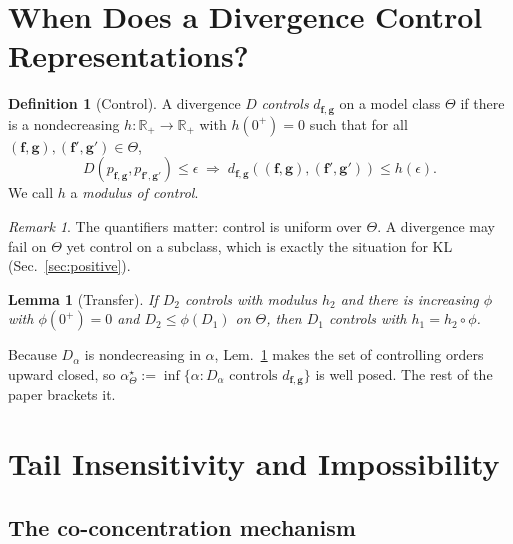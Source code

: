 \documentclass[10pt,letterpaper,twocolumn]{article}
\newcommand{\bff}{\mathbf{f}}
\newcommand{\bfg}{\mathbf{g}}
\newcommand{\dfg}{d_{\bff,\bfg}}
\newcommand{\Dalpha}{D_{\alpha}}
\theoremstyle{plain}
\newtheorem{lemma}[theorem]{Lemma}
\theoremstyle{definition}
\newtheorem{definition}[theorem]{Definition}
\theoremstyle{remark}
\newtheorem{remark}[theorem]{Remark}
\begin{document}
\section{When Does a Divergence Control Representations?}
\label{sec:control}

\begin{definition}[Control]
\label{def:control}
A divergence $D$ \emph{controls} $\dfg$ on a model class $\Theta$ if there is a
nondecreasing $h:\mathbb{R}_{+}\!\to\!\mathbb{R}_{+}$ with $h(0^{+})=0$ such
that for all $(\bff,\bfg),(\bff',\bfg')\in\Theta$,
\begin{equation}
D\!\left(p_{\bff,\bfg},p_{\bff',\bfg'}\right)\le\epsilon
\;\Longrightarrow\;
\dfg\!\left((\bff,\bfg),(\bff',\bfg')\right)\le h(\epsilon).
\label{eq:control}
\end{equation}
We call $h$ a \emph{modulus of control}.
\end{definition}

\begin{remark}
The quantifiers matter: control is uniform over $\Theta$. A divergence may fail
on $\Theta$ yet control on a subclass, which is exactly the situation for KL
(Sec.~\ref{sec:positive}).
\end{remark}

\begin{lemma}[Transfer]
\label{lem:transfer}
If $D_{2}$ controls with modulus $h_{2}$ and there is increasing $\phi$ with
$\phi(0^{+})=0$ and $D_{2}\le\phi(D_{1})$ on $\Theta$, then $D_{1}$ controls
with $h_{1}=h_{2}\circ\phi$.
\end{lemma}

Because $\Dalpha$ is nondecreasing in $\alpha$, Lem.~\ref{lem:transfer} makes
the set of controlling orders upward closed, so
$\alpha^{\star}_{\Theta}:=\inf\{\alpha:\Dalpha\text{ controls }\dfg\}$ is well
posed. The rest of the paper brackets it.

\section{Tail Insensitivity and Impossibility}
\label{sec:negative}

\subsection{The co-concentration mechanism}
\end{document}

